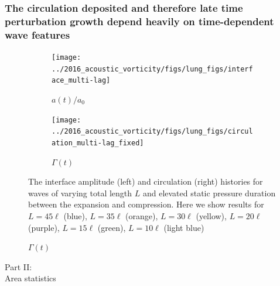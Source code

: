 \begin{frame}
  \frametitle{The circulation deposited and therefore late time perturbation growth depend heavily on time-dependent wave features}
  \begin{figure}
  \centering
  \begin{subfigure}{0.49\textwidth}
    \texttt{[image: ../2016\_acoustic\_vorticity/figs/lung\_figs/interface\_multi-lag]}
    \caption{$a(t)/a_0$}
  \end{subfigure}
  \begin{subfigure}{0.49\textwidth}
  \texttt{[image: ../2016\_acoustic\_vorticity/figs/lung\_figs/circulation\_multi-lag\_fixed]}
  \caption{$\Gamma(t)$}
  \end{subfigure}
  \begin{flushleft}
    {\footnotesize
    The interface amplitude (left) and circulation (right) histories
    for waves of varying total length $L$ and elevated static pressure
    duration between the expansion and compression. Here we show
    results for $L=45\ell$ (blue), $L=35\ell$ (orange), $L=30\ell$
    (yellow), $L=20\ell$ (purple), $L=15\ell$ (green), $L=10\ell$
    (light blue)
    }
  \end{flushleft}
  \label{fig:trapz_circ_interface_multi-lag}
\end{figure}
\end{frame}
%

% 
\begin{frame}
  \centering
  \begin{center}
    {\LARGE Part II:\\Area statistics}\\
  \end{center}
\end{frame}



